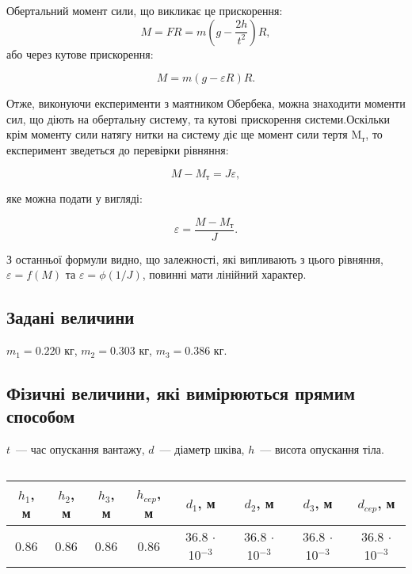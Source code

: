 \documentclass[12pt]{article}
\begin{document}
{Обертальний момент сили, що викликає це прискорення:
$$M=FR=m\left(g-\frac{2h}{t^2}\right)R,$$
або через кутове прискорення:

$$M=m(g-\varepsilon R)R.$$

Отже, виконуючи експерименти з маятником Обербека, можна знаходити моменти сил, що діють на обертальну систему, та кутові прискорення системи.Оскільки крім моменту сили натягу нитки на систему діє ще момент сили тертя  M$_\textrm{т}$, то експеримент зведеться до перевірки рівняння:

$$M-M_\textrm{т} = J\varepsilon,$$

яке можна подати у вигляді:

$$\varepsilon=\frac{M-M_\textrm{т}}{J}.$$

З останньої формули видно, що залежності, які випливають з цього рівняння, $\varepsilon=f(M)$ та
$\varepsilon=\phi(1/J)$, повинні мати лінійний характер.

\subsection*{Задані величини}

$m_1 = 0.220$ кг,
$m_2 = 0.303$ кг,
$m_3= 0.386$ кг.

\subsection*{Фізичні величини, які вимірюються прямим способом}
$t$~--- час опускання вантажу, $d$~--- діаметр шківа, $h$~--- висота опускання тіла.

\subsection*{}

\renewcommand{\arraystretch}{1.1}
\subsubsection*{}

\begin{center}

	

\subsubsection*{}
\begin{tabular}{|c| c| c| c| c| c| c| c|}
	\hline
	$h_1$, м & $h_2$, м & $h_3$, м & $h_{cep}$, м & $d_1$, м & $d_2$, м & $d_3$, м & $d_{cep}$, м\\
	\hline
	0.86 & 0.86 & 0.86 & 0.86 & 36.8 $\cdot$ 10$^{-3}$
	& 36.8 $\cdot$ 10$^{-3}$ & 36.8 $\cdot$ 10$^{-3}$
	& 36.8 $\cdot$ 10$^{-3}$\\
	\hline
\end{tabular}


\end{center}}
\end{document}
